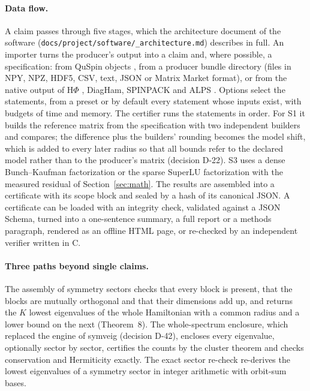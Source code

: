 \documentclass[11pt,a4paper]{article}
\newcommand{\code}[1]{\texttt{#1}}
\begin{document}
\paragraph{Data flow.}
A claim passes through five stages, which the architecture document of the software
(\code{docs/\allowbreak project/\allowbreak software/\allowbreak 01\_architecture.md}) describes in full. An importer
turns the producer's
output into a claim and, where possible, a specification: from QuSpin objects \cite{QuSpin1,QuSpin2}, from a producer
bundle directory (files in NPY, NPZ, HDF5, CSV, text, JSON or Matrix Market format), or from the native output of
H$\Phi$ \cite{HPhi}, DiagHam, SPINPACK and ALPS \cite{ALPS2011}. Options select the statements, from a preset or by
default every statement whose inputs exist, with budgets of time and memory. The certifier runs the statements in
order. For S1 it builds the reference matrix from the specification with two independent builders and compares; the
difference plus the builders' rounding becomes the model shift, which is added to every later radius so that all
bounds refer to the declared model rather than to the producer's matrix (decision D-22). S3 uses a dense
Bunch--Kaufman factorization \cite{BunchKaufman1977} or the sparse SuperLU factorization with the measured residual of
Section~\ref{sec:math}. The results are assembled into a certificate with its scope block and sealed by a hash of its
canonical JSON. A certificate can be loaded with an integrity check, validated against a JSON Schema, turned into a
one-sentence summary, a full report or a methods paragraph, rendered as an offline HTML page, or re-checked by an
independent verifier written in C.

\paragraph{Three paths beyond single claims.}
The assembly of symmetry sectors checks that every block is present, that the blocks are mutually orthogonal and that
their dimensions add up, and returns the $K$ lowest eigenvalues of the whole Hamiltonian with a common radius and a
lower bound on the next (Theorem~8). The whole-spectrum enclosure, which replaced the engine of symveig (decision
D-42), encloses every eigenvalue, optionally sector by sector, certifies the counts by the cluster theorem and checks
conservation and Hermiticity exactly. The exact sector re-check re-derives the lowest eigenvalues of a symmetry sector
in integer arithmetic with orbit-sum bases.
\end{document}
